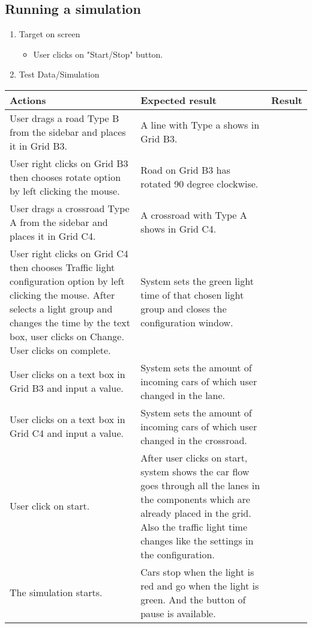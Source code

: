 \subsection{Running a simulation}

\begin{enumerate}

	\item Target on screen
	\begin{itemize}
		\item User clicks on "Start/Stop" button.
	\end{itemize}
	\item Test Data/Simulation
\end{enumerate}	
	\begin{tabularx}{\textwidth}{|X|X|p{2.5cm}|}\hline
		Actions & Expected result & Result \\\hline

		User drags a road Type B from the sidebar and places it in Grid B3. & A line with Type a shows in Grid B3. & \pass \\\hline
		User right clicks on Grid B3 then chooses rotate option by left clicking the mouse. & Road on Grid B3 has rotated 90 degree clockwise. & \pass \\\hline
		User drags a crossroad Type A from the sidebar and places it in Grid C4. & A crossroad with Type A shows in Grid C4. & \pass \\\hline
		User right clicks on Grid C4 then chooses Traffic light configuration  option by left clicking the mouse. After selects a light group and changes the time by the text box, user clicks on Change. User clicks on complete. & System sets the green light time of that chosen light group and closes the configuration window.  & \pass \\\hline
		User clicks on a text box in Grid B3 and input a value. & System sets the amount of incoming cars of which user changed in the lane. & \pass \\\hline
		User clicks on a text box in Grid C4 and input a value. & System sets the amount of incoming cars of which user changed in the crossroad. & \pass \\\hline
		User click on start. & After user clicks on start, system shows the car flow goes through all the lanes in the components which are already placed in the grid. Also the traffic light time changes like the settings in the configuration. & \pass \\\hline
		The simulation starts. &	Cars stop when the light is red and go when the light is green. And the button of pause is available. & \pass \\\hline	
	\end{tabularx}


